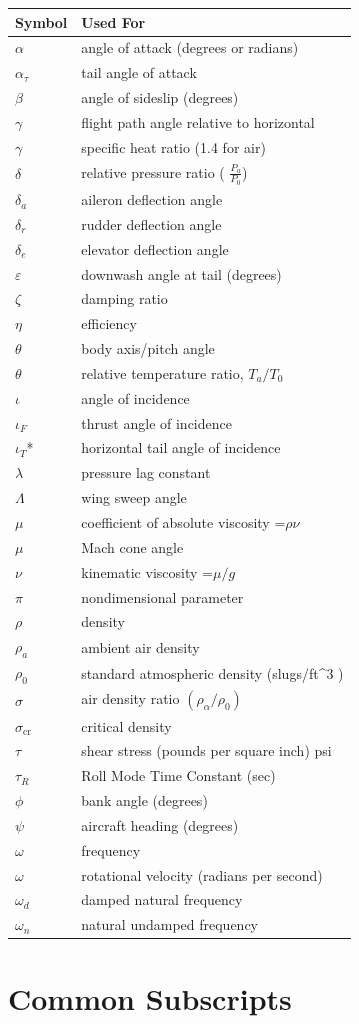 \documentclass[
]{book}
\begin{document}
\begin{longtable}[]{@{}ll@{}}
\toprule
Symbol & Used For\tabularnewline
\midrule
\endhead
\(\alpha\) & angle of attack (degrees or radians)\tabularnewline
\(\alpha_{\tau}\) & tail angle of attack\tabularnewline
\(\beta\) & angle of sideslip (degrees)\tabularnewline
\(\gamma\) & flight path angle relative to horizontal\tabularnewline
\(\gamma\) & specific heat ratio (1.4 for air)\tabularnewline
\(\delta\) & relative pressure ratio ( \(\frac{P_a}{P_0}\))\tabularnewline
\(\delta_a\) & aileron deflection angle\tabularnewline
\(\delta_r\) & rudder deflection angle\tabularnewline
\(\delta_e\) & elevator deflection angle\tabularnewline
\(\varepsilon\) & downwash angle at tail (degrees)\tabularnewline
\(\zeta\) & damping ratio\tabularnewline
\(\eta\) & efficiency\tabularnewline
\(\theta\) & body axis/pitch angle\tabularnewline
\(\theta\) & relative temperature ratio, \(T_a / T_0\)\tabularnewline
\(\iota\) & angle of incidence\tabularnewline
\(\iota_F\) & thrust angle of incidence\tabularnewline
\(\iota_T\)* & horizontal tail angle of incidence\tabularnewline
\(\lambda\) & pressure lag constant\tabularnewline
\(\Lambda\) & wing sweep angle\tabularnewline
\(\mu\) & coefficient of absolute viscosity =\(\rho \nu\)\tabularnewline
\(\mu\) & Mach cone angle\tabularnewline
\(\nu\) & kinematic viscosity =\(\mu / g\)\tabularnewline
\(\pi\) & nondimensional parameter\tabularnewline
\(\rho\) & density\tabularnewline
\(\rho_a\) & ambient air density\tabularnewline
\(\rho_0\) & standard atmospheric density (slugs/ft\^{}3 )\tabularnewline
\(\sigma\) & air density ratio \((\rho_{\alpha} / \rho_0)\)\tabularnewline
\(\sigma_{\mathrm{cr}}\) & critical density\tabularnewline
\(\tau\) & shear stress (pounds per square inch) psi\tabularnewline
\(\tau_R\) & Roll Mode Time Constant (sec)\tabularnewline
\(\phi\) & bank angle (degrees)\tabularnewline
\(\psi\) & aircraft heading (degrees)\tabularnewline
\(\omega\) & frequency\tabularnewline
\(\omega\) & rotational velocity (radians per second)\tabularnewline
\(\omega_d\) & damped natural frequency\tabularnewline
\(\omega_n\) & natural undamped frequency\tabularnewline
\bottomrule
\end{longtable}

\hypertarget{common-subscripts}{%
\section{Common Subscripts}\label{common-subscripts}}
\end{document}
